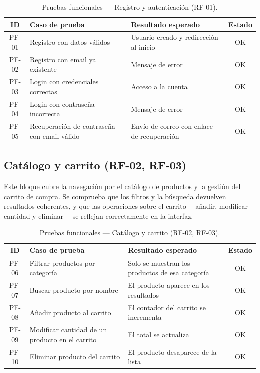 \begin{table}[H]
\centering
\begin{tabular}{|c|L{5.5cm}|L{6cm}|c|}
\hline
\textbf{ID} & \textbf{Caso de prueba} & \textbf{Resultado esperado} & \textbf{Estado} \\
\hline
PF-01 & Registro con datos válidos & Usuario creado y redirección al inicio & OK \\
\hline
PF-02 & Registro con email ya existente & Mensaje de error & OK \\
\hline
PF-03 & Login con credenciales correctas & Acceso a la cuenta & OK \\
\hline
PF-04 & Login con contraseña incorrecta & Mensaje de error & OK \\
\hline
PF-05 & Recuperación de contraseña con email válido & Envío de correo con enlace de recuperación & OK \\
\hline
\end{tabular}
\caption{Pruebas funcionales — Registro y autenticación (RF-01).}
\label{tab:pf-rf01}
\end{table}

\subsection{Catálogo y carrito (RF-02, RF-03)}

Este bloque cubre la navegación por el catálogo de productos y la gestión del carrito de compra. Se comprueba que los filtros y la búsqueda devuelven resultados coherentes, y que las operaciones sobre el carrito —añadir, modificar cantidad y eliminar— se reflejan correctamente en la interfaz.

\begin{table}[H]
\centering
\begin{tabular}{|c|L{5.5cm}|L{6cm}|c|}
\hline
\textbf{ID} & \textbf{Caso de prueba} & \textbf{Resultado esperado} & \textbf{Estado} \\
\hline
PF-06 & Filtrar productos por categoría & Solo se muestran los productos de esa categoría & OK \\
\hline
PF-07 & Buscar producto por nombre & El producto aparece en los resultados & OK \\
\hline
PF-08 & Añadir producto al carrito & El contador del carrito se incrementa & OK \\
\hline
PF-09 & Modificar cantidad de un producto en el carrito & El total se actualiza & OK \\
\hline
PF-10 & Eliminar producto del carrito & El producto desaparece de la lista & OK \\
\hline
\end{tabular}
\caption{Pruebas funcionales — Catálogo y carrito (RF-02, RF-03).}
\label{tab:pf-rf02-03}
\end{table}

